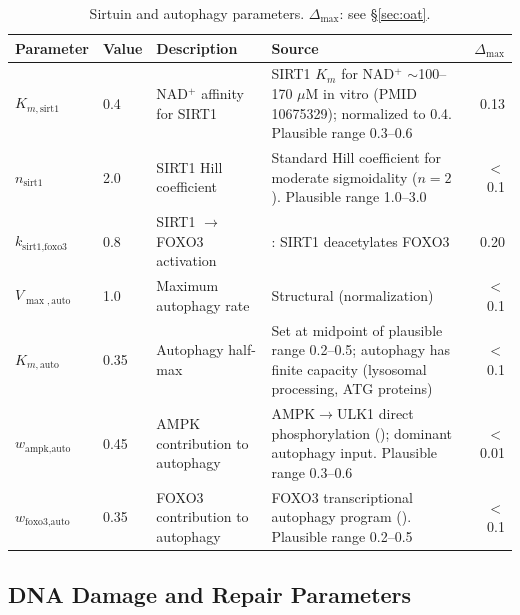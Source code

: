\documentclass[11pt]{article}
\begin{document}
\begin{table}[H]
\centering
\caption{Sirtuin and autophagy parameters. $\Delta_{\max}$: see \S\ref{sec:oat}.}
\begin{tabular}{|ll|p{3cm}|p{6cm}|r|}
\hline
Parameter & Value & Description & Source & $\Delta_{\max}$ \\
\hline
$K_{m,\text{sirt1}}$ & 0.4 & NAD$^+$ affinity for SIRT1 & SIRT1 $K_m$ for NAD$^+$ $\sim$100--170 $\mu$M in vitro (PMID 10675329); normalized to 0.4. Plausible range 0.3--0.6 & 0.13 \\
\hline
$n_{\text{sirt1}}$ & 2.0 & SIRT1 Hill coefficient & Standard Hill coefficient for moderate sigmoidality ($n=2$). Plausible range 1.0--3.0 & $<$0.1 \\
\hline
$k_{\text{sirt1,foxo3}}$ & 0.8 & SIRT1 $\to$ FOXO3 activation & \citet{Brunet2004}: SIRT1 deacetylates FOXO3 & 0.20 \\
\hline
$V_{\max,\text{auto}}$ & 1.0 & Maximum autophagy rate & Structural (normalization) & $<$0.1 \\
\hline
$K_{m,\text{auto}}$ & 0.35 & Autophagy half-max & Set at midpoint of plausible range 0.2--0.5; autophagy has finite capacity (lysosomal processing, ATG proteins) & $<$0.1 \\
\hline
$w_{\text{ampk,auto}}$ & 0.45 & AMPK contribution to autophagy & AMPK$\to$ULK1 direct phosphorylation (\citet{Kim2011}); dominant autophagy input. Plausible range 0.3--0.6 & $<$0.01 \\
\hline
$w_{\text{foxo3,auto}}$ & 0.35 & FOXO3 contribution to autophagy & FOXO3 transcriptional autophagy program (\citet{Warr2013}). Plausible range 0.2--0.5 & $<$0.1 \\
\hline
\end{tabular}
\end{table}

\subsection{DNA Damage and Repair Parameters}
\end{document}
